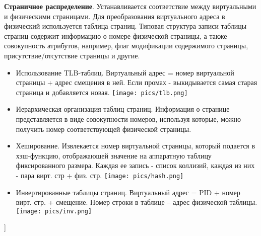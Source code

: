 \textbf{Страничное распределение}. Устанавливается соответствие между виртуальными и физическими страницами. Для преобразования виртуального адреса в физический используется таблица страниц. Типовая структура записи таблицы страниц содержит информацию о номере физической страницы, а также совокупность атрибутов, например, флаг модификации содержимого страницы, присутствие/отсутствие страницы и другие. 
\begin{itemize}
    \item Использование TLB-таблиц. Виртуальный адрес = номер виртуальной страницы + адрес смещения в ней. Если промах - выкидывается самая старая страница и добавляется новая. 
    \texttt{[image: pics/tlb.png]}
    \item Иерархическая организация таблиц страниц. Информация о странице представляется в виде совокупности номеров, используя которые, можно получить номер соответствующей физической страницы. 
    \item Хеширование. Извлекается номер виртуальной страницы, который подается в хэш-функцию, отображающей значение на аппаратную таблицу фиксированного размера. Каждая ее запись - список коллизий, каждая из них - пара вирт. стр + физ. стр.  
    \texttt{[image: pics/hash.png]}
    \item Инвертированные таблицы страниц. Виртуальный адрес = PID + номер вирт. стр. + смещение. Номер строки в таблице -- адрес физической таблицы.
    \texttt{[image: pics/inv.png]}
\end{itemize}


\bigbreak
[\cite[page 69-96]{replace_me}]